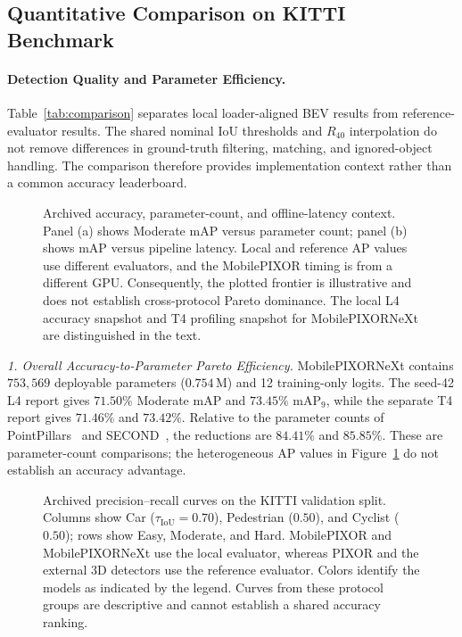 \subsection{Quantitative Comparison on KITTI Benchmark}
\label{sec:benchmark_comparison}



\paragraph{Detection Quality and Parameter Efficiency.}
Table~\ref{tab:comparison} separates local loader-aligned BEV results from reference-evaluator results. The shared nominal IoU thresholds and $R_{40}$ interpolation do not remove differences in ground-truth filtering, matching, and ignored-object handling. The comparison therefore provides implementation context rather than a common accuracy leaderboard.

\begin{figure}[t]
\centering
{}
\caption{Archived accuracy, parameter-count, and offline-latency context. Panel (a) shows Moderate mAP versus parameter count; panel (b) shows mAP versus pipeline latency. Local and reference AP values use different evaluators, and the MobilePIXOR timing is from a different GPU. Consequently, the plotted frontier is illustrative and does not establish cross-protocol Pareto dominance. The local L4 accuracy snapshot and T4 profiling snapshot for MobilePIXORNeXt are distinguished in the text.}
\label{fig:pareto_tradeoff}
\end{figure}

\textit{1. Overall Accuracy-to-Parameter Pareto Efficiency.}
MobilePIXORNeXt contains $753{,}569$ deployable parameters ($0.754\,\text{M}$) and 12 training-only logits. The seed-42 L4 report gives $71.50\%$ Moderate mAP and $73.45\%$ $\text{mAP}_9$, while the separate T4 report gives $71.46\%$ and $73.42\%$. Relative to the parameter counts of PointPillars~\cite{lang2019pointpillars} and SECOND~\cite{yan2018second}, the reductions are $84.41\%$ and $85.85\%$. These are parameter-count comparisons; the heterogeneous AP values in Figure~\ref{fig:pareto_tradeoff} do not establish an accuracy advantage.

\begin{figure}[!t]
\centering
{}
\caption{Archived precision--recall curves on the KITTI validation split. Columns show Car ($\tau_{\mathrm{IoU}}=0.70$), Pedestrian ($0.50$), and Cyclist ($0.50$); rows show Easy, Moderate, and Hard. MobilePIXOR and MobilePIXORNeXt use the local evaluator, whereas PIXOR and the external 3D detectors use the reference evaluator. Colors identify the models as indicated by the legend. Curves from these protocol groups are descriptive and cannot establish a shared accuracy ranking.}
\label{fig:pr_curves}
\end{figure}


